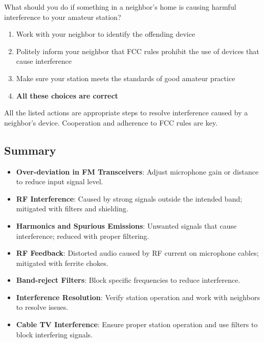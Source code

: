 \begin{tcolorbox}[colback=gray!10!white,colframe=black!75!black,title={T7B08}]
    What should you do if something in a neighbor’s home is causing harmful interference to your amateur station?
    \begin{enumerate}[label=\Alph*),noitemsep]
        \item Work with your neighbor to identify the offending device
        \item Politely inform your neighbor that FCC rules prohibit the use of devices that cause interference
        \item Make sure your station meets the standards of good amateur practice
        \item \textbf{All these choices are correct}
    \end{enumerate}
\end{tcolorbox}
All the listed actions are appropriate steps to resolve interference caused by a neighbor's device. Cooperation and adherence to FCC rules are key.


\subsection*{Summary}
\begin{itemize}
    \item \textbf{Over-deviation in FM Transceivers}: Adjust microphone gain or distance to reduce input signal level.
    \item \textbf{RF Interference}: Caused by strong signals outside the intended band; mitigated with filters and shielding.
    \item \textbf{Harmonics and Spurious Emissions}: Unwanted signals that cause interference; reduced with proper filtering.
    \item \textbf{RF Feedback}: Distorted audio caused by RF current on microphone cables; mitigated with ferrite chokes.
    \item \textbf{Band-reject Filters}: Block specific frequencies to reduce interference.
    \item \textbf{Interference Resolution}: Verify station operation and work with neighbors to resolve issues.
    \item \textbf{Cable TV Interference}: Ensure proper station operation and use filters to block interfering signals.
\end{itemize}
